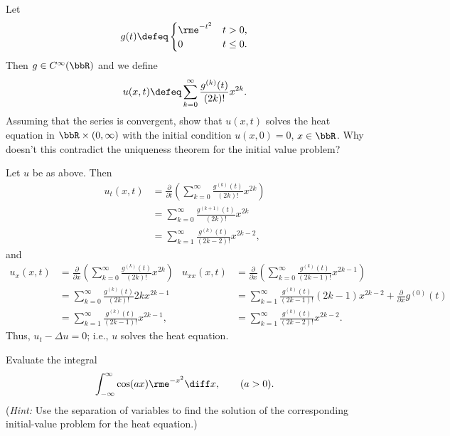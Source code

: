 \newpage

\begin{problem}
  Let
  \[
    g(t)\defeq
    \begin{cases}
      \rme^{-t^2}&t>0,\\
      0&t\leq 0.
    \end{cases}
  \]
  Then \(g\in C^\infty(\bbR)\) and we define
  \[
    u(x,t)\defeq\sum_{k=0}^\infty\frac{g^{(k)}(t)}{(2k)!}x^{2k}.
  \]
  Assuming that the series is convergent, show that \(u(x,t)\) solves the
  heat equation in \(\bbR\times(0,\infty)\) with the initial condition
  \(u(x,0)=0\), \(x\in\bbR\). Why doesn't this contradict the uniqueness
  theorem for the initial value problem?
\end{problem}
\begin{solution}
  Let \(u\) be as above. Then
  \begin{align*}
    u_t(x,t)
    &=\frac{\partial}{\partial t}
      \left(
      \sum_{k=0}^\infty\frac{g^{(k)}(t)}{(2k)!}x^{2k}
      \right)\\
    &=\sum_{k=0}^\infty \frac{g^{(k+1)}(t)}{(2k)!}x^{2k}\\
    &=\sum_{k=1}^\infty \frac{g^{(k)}(t)}{(2k-2)!}x^{2k-2},
  \end{align*}
  and
  \begin{align*}
    u_x(x,t)
    &=\frac{\partial}{\partial x}
      \left(
      \sum_{k=0}^\infty\frac{g^{(k)}(t)}{(2k)!}x^{2k}
      \right)
    &u_{xx}(x,t)
    &=\frac{\partial}{\partial x}
      \left(
      \sum_{k=0}^\infty\frac{g^{(k)}(t)}{(2k-1)!}x^{2k-1}
      \right)\\
    &=\sum_{k=0}^\infty\frac{g^{(k)}(t)}{(2k)!} 2kx^{2k-1}
    &&=\sum_{k=1}^\infty \frac{g^{(k)}(t)}{(2k-1)!}(2k-1)x^{2k-2}
       +\tfrac{\partial}{\partial x}g^{(0)}(t)\\
    &=\sum_{k=1}^\infty\frac{g^{(k)}(t)}{(2k-1)!}x^{2k-1},
    &&=\sum_{k=1}^\infty\frac{g^{(k)}(t)}{(2k-2)!}x^{2k-2}.
  \end{align*}
  Thus, \(u_t-\Delta u=0\); i.e., \(u\) solves the heat equation.
\end{solution}
\newpage

\begin{problem}
  Evaluate the integral
  \[
    \int_{-\infty}^\infty \cos(ax)\rme^{-x^2}\diff x,\qquad (a>0).
  \]
  \noindent (\emph{Hint:} Use the separation of variables to find the
  solution of the corresponding initial-value problem for the heat
  equation.)
\end{problem}
\begin{solution}
\end{solution}

